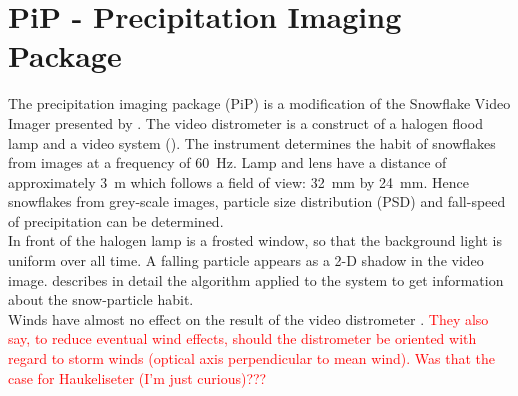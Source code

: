 \pagebreak
\section{PiP - Precipitation Imaging Package}

The precipitation imaging package (PiP) is a modification of the Snowflake Video Imager presented by \cite{newman_presenting_2009}. The video distrometer is a construct of a halogen flood lamp and a video system (). The instrument determines the habit of snowflakes from images at a frequency of \SI{60}{\Hz}. Lamp and lens have a distance of approximately \SI{3}{\metre} which follows a field of view: \SI{32}{\mm} by \SI{24}{\mm}. Hence snowflakes from grey-scale images, particle size distribution (PSD) and fall-speed of precipitation can be determined. 
\\
In front of the halogen lamp is a frosted window, so that the background light is uniform over all time. A falling particle appears as a 2-D shadow in the video image. \cite{newman_presenting_2009} describes in detail the algorithm applied to the system to get information about the snow-particle habit. \\
Winds have almost no effect on the result of the video distrometer \citep{newman_presenting_2009}. \textcolor{red}{They also say, to reduce eventual wind effects, should the distrometer be oriented with regard to storm winds (optical axis perpendicular to mean wind). Was that the case for Haukeliseter (I'm just curious)???}

\pagebreak
